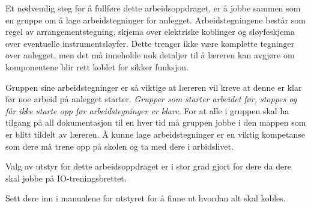 \vskip 10pt

Et nødvendig steg for å fullføre dette arbeidsoppdraget, er å jobbe sammen som en gruppe om å lage arbeidstegninger for anlegget. Arbeidstegningene består som regel av arrangementstegning, skjema over elektriske koblinger og sløyfeskjema over eventuelle instrumentsløyfer. Dette trenger ikke være komplette tegninger over anlegget, men det må inneholde nok detaljer til å læreren kan avgjøre om komponentene blir rett koblet for sikker funksjon.





Gruppen sine arbeidstegninger er så viktige at læreren vil kreve at denne er klar før noe arbeid på anlegget starter. \textit{Grupper som starter arbeidet før, stoppes og får ikke starte opp før arbeidstegninger er klare.  } For at alle i gruppen skal ha tilgang på all dokumentasjon til en hver tid må gruppen jobbe i den mappen som er blitt tildelt av læreren. Å kunne lage arbeidstegninger er en viktig kompetanse som dere må trene opp på skolen og ta med dere i arbidslivet.  


\vskip 10pt


Valg av utstyr for dette arbeidsoppdraget er i stor grad gjort for dere da dere skal jobbe på IO-treningsbrettet. 

Sett dere inn i manualene for utstyret for å finne ut hvordan alt skal kobles. 


\vskip 10pt


